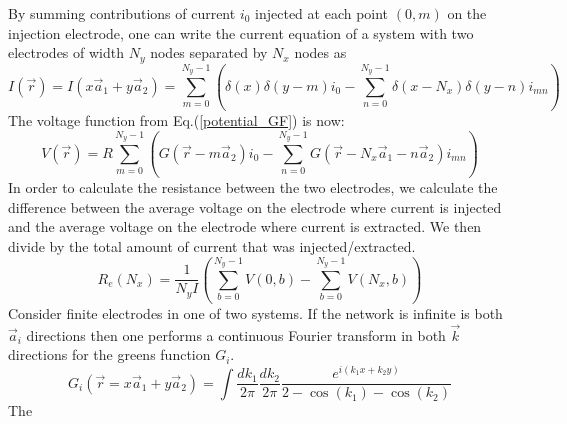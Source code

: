 By summing contributions of current $i_0$ injected at each point $(0,m)$ on the injection electrode, one can write the current equation of a system with two electrodes of width $N_y$ nodes separated by $N_x$ nodes as
\begin{equation}
I(\vec{r})=I(x\vec{a}_1 + y\vec{a}_2) = \sum_{m=0}^{N_y-1}\left( \delta(x)\delta(y-m) i_0 - \sum_{n=0}^{N_y-1} \delta(x - N_x) \delta(y-n)  i_{mn} \right)
\end{equation}
The voltage function from Eq.(\ref{potential_GF}) is now:
\begin{equation}
V(\vec{r}) = R \sum_{m=0}^{N_y-1}\left(G(\vec{r}-m\vec{a}_2)i_0 - \sum_{n=0}^{N_y-1}G(\vec{r} - N_x\vec{a}_1 - n\vec{a}_2) i_{mn}  \right)
\end{equation}
In order to calculate the resistance between the two electrodes, we calculate the difference between the average voltage on the electrode where current is injected and the average voltage on the electrode where current is extracted. We then divide by the total amount of current that was injected/extracted.
\begin{equation}
R_{e}(N_x) = \frac{1}{N_y I}\left(\sum_{b=0}^{N_y-1}V(0,b) - \sum_{b=0}^{N_y-1}V(N_x,b)\right)
\end{equation}
Consider finite electrodes in one of two systems. If the network is infinite is both $\vec{a}_i$ directions then one performs a continuous Fourier transform in both $\vec{k}$ directions for the greens function $G_i$. 
\begin{equation}
G_i(\vec{r} = x \vec{a}_1 + y \vec{a}_2) =   \int \frac{dk_1}{2 \pi} \frac{dk_2}{2 \pi} \frac{e^{i(k_1  x +  k_2 y)}}{2 - \cos(k_1) - \cos(k_2)}
\end{equation}
The 


